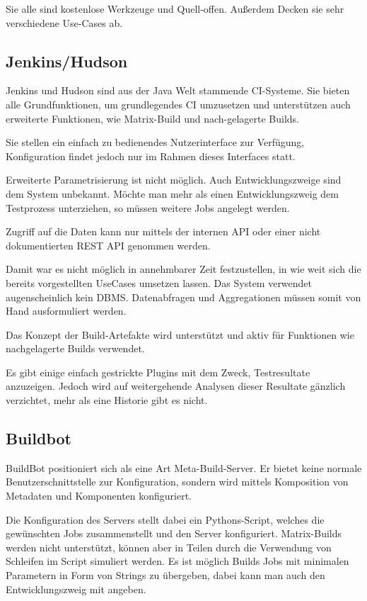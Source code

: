 Sie alle sind kostenlose Werkzeuge und Quell-offen.
Außerdem Decken sie sehr verschiedene Use-Cases ab.

\subsection{Jenkins/Hudson}

Jenkins und Hudson sind aus der Java Welt  stammende CI-Systeme.
Sie bieten alle Grundfunktionen, um grundlegendes CI umzusetzen
und unterst\"utzen auch erweiterte Funktionen,
wie Matrix-Build und nach-gelagerte Builds.

Sie stellen ein einfach zu bedienendes Nutzerinterface zur Verfügung,
Konfiguration findet jedoch nur im Rahmen dieses Interfaces statt.

Erweiterte Parametrisierung ist nicht m\"oglich.
Auch Entwicklungszweige sind dem System unbekannt.
M\"ochte man mehr als einen Entwicklungszweig dem Testprozess unterziehen,
so m\"ussen weitere Jobs angelegt werden.

Zugriff auf die Daten kann nur mittels der internen API oder
einer nicht dokumentierten REST API genommen werden.

Damit war es nicht m\"oglich in annehmbarer Zeit festzustellen,
in wie weit sich die bereits vorgestellten UseCases umsetzen lassen.
Das System verwendet augenscheinlich kein DBMS.
Datenabfragen und Aggregationen m\"ussen
somit von Hand ausformuliert werden.

Das Konzept der Build-Artefakte wird unterst\"utzt und
aktiv f\"ur Funktionen wie nachgelagerte Builds verwendet.

Es gibt einige einfach gestrickte Plugins mit dem Zweck, Testresultate anzuzeigen.
Jedoch wird auf weitergehende Analysen dieser Resultate g\"anzlich verzichtet,
mehr als eine Historie gibt es nicht.


\subsection{Buildbot}


BuildBot \cite{buildbot:website} positioniert sich als eine Art Meta-Build-Server.
Er bietet keine normale Benutzerschnittstelle zur Konfiguration,
sondern wird mittels Komposition von Metadaten und Komponenten konfiguriert.

Die Konfiguration des Servers stellt dabei ein Pythons-Script,
welches die gewünschten Jobs zusammenstellt und den Server konfiguriert.
Matrix-Builds werden nicht unterst\"utzt,
k\"onnen aber in Teilen durch die Verwendung von Schleifen im Script simuliert werden.
Es ist möglich Builds Jobs mit minimalen Parametern in Form von Strings zu \"ubergeben,
dabei kann man auch den Entwicklungszweig mit angeben.

